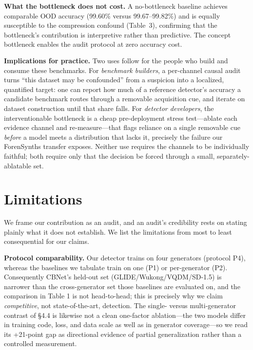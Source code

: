 \textbf{What the bottleneck does not cost.} A no-bottleneck baseline achieves comparable OOD accuracy (99.60\% versus 99.67--99.82\%) and is equally susceptible to the compression confound (Table~3), confirming that the bottleneck's contribution is interpretive rather than predictive. The concept bottleneck enables the audit protocol at zero accuracy cost.

\textbf{Implications for practice.} Two uses follow for the people who build and consume these benchmarks. For \emph{benchmark builders}, a per-channel causal audit turns ``this dataset may be confounded'' from a suspicion into a localized, quantified target: one can report how much of a reference detector's accuracy a candidate benchmark routes through a removable acquisition cue, and iterate on dataset construction until that share falls. For \emph{detector developers}, the interventionable bottleneck is a cheap pre-deployment stress test---ablate each evidence channel and re-measure---that flags reliance on a single removable cue \emph{before} a model meets a distribution that lacks it, precisely the failure our ForenSynths transfer exposes. Neither use requires the channels to be individually faithful; both require only that the decision be forced through a small, separately-ablatable set.

\section{Limitations}

We frame our contribution as an audit, and an audit's credibility rests on stating plainly what it does not establish. We list the limitations from most to least consequential for our claims.

\textbf{Protocol comparability.} Our detector trains on four generators (protocol P4), whereas the baselines we tabulate train on one (P1) or per-generator (P2). Consequently CBNet's held-out set (GLIDE/Wukong/VQDM/SD-1.5) is narrower than the cross-generator set those baselines are evaluated on, and the comparison in Table 1 is not head-to-head; this is precisely why we claim \emph{competitive}, not state-of-the-art, detection. The single- versus multi-generator contrast of \S{}4.4 is likewise not a clean one-factor ablation---the two models differ in training code, loss, and data scale as well as in generator coverage---so we read its +21-point gap as directional evidence of partial generalization rather than a controlled measurement.

